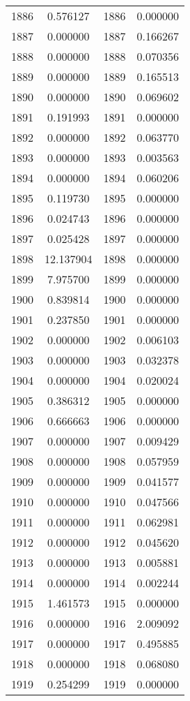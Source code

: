 \documentclass[12pt]{article}
\begin{document}
\begin{longtable}{@{}cccc@{}}
1886 & 0.576127 & 1886 & 0.000000 \\
1887 & 0.000000 & 1887 & 0.166267 \\
1888 & 0.000000 & 1888 & 0.070356 \\
1889 & 0.000000 & 1889 & 0.165513 \\
1890 & 0.000000 & 1890 & 0.069602 \\
1891 & 0.191993 & 1891 & 0.000000 \\
1892 & 0.000000 & 1892 & 0.063770 \\
1893 & 0.000000 & 1893 & 0.003563 \\
1894 & 0.000000 & 1894 & 0.060206 \\
1895 & 0.119730 & 1895 & 0.000000 \\
1896 & 0.024743 & 1896 & 0.000000 \\
1897 & 0.025428 & 1897 & 0.000000 \\
1898 & 12.137904 & 1898 & 0.000000 \\
1899 & 7.975700 & 1899 & 0.000000 \\
1900 & 0.839814 & 1900 & 0.000000 \\
1901 & 0.237850 & 1901 & 0.000000 \\
1902 & 0.000000 & 1902 & 0.006103 \\
1903 & 0.000000 & 1903 & 0.032378 \\
1904 & 0.000000 & 1904 & 0.020024 \\
1905 & 0.386312 & 1905 & 0.000000 \\
1906 & 0.666663 & 1906 & 0.000000 \\
1907 & 0.000000 & 1907 & 0.009429 \\
1908 & 0.000000 & 1908 & 0.057959 \\
1909 & 0.000000 & 1909 & 0.041577 \\
1910 & 0.000000 & 1910 & 0.047566 \\
1911 & 0.000000 & 1911 & 0.062981 \\
1912 & 0.000000 & 1912 & 0.045620 \\
1913 & 0.000000 & 1913 & 0.005881 \\
1914 & 0.000000 & 1914 & 0.002244 \\
1915 & 1.461573 & 1915 & 0.000000 \\
1916 & 0.000000 & 1916 & 2.009092 \\
1917 & 0.000000 & 1917 & 0.495885 \\
1918 & 0.000000 & 1918 & 0.068080 \\
1919 & 0.254299 & 1919 & 0.000000 \\

\end{longtable}
\end{document}
